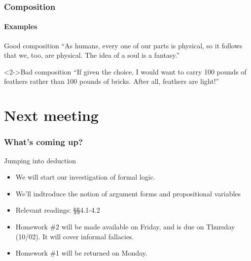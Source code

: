 \documentclass[10pt,letterpaper,xcolor=dvipsnames,handout]{beamer}
\begin{document}
\begin{frame}
  \frametitle{Composition}
  \framesubtitle{Examples}
  
  \begin{block}{Good composition}
    ``As humans, every one of our parts is physical, so it follows that we, too, are physical.  The idea of a soul is a fantasy.''
  \end{block}
  
  \begin{block}<2->{Bad composition}
    ``If given the choice, I would want to carry 100 pounds of feathers rather than 100 pounds of bricks.  After all, feathers are light!''
  \end{block}
  
\end{frame}



\section{Next meeting}

\begin{frame}
  \frametitle{What's coming up?}

  \begin{block}{Jumping into deduction}
    \begin{itemize}
      \item We will start our investigation of formal logic.
      \item We'll indtroduce the notion of argument forms and propositional variables
      \item Relevant readings: \S\S 4.1-4.2
      \item Homework \#2 will be made available on Friday, and is due on Thursday (10/02).  It will cover informal fallacies.
      \item Homework \#1 will be returned on Monday.
    \end{itemize}
  \end{block}
  
\end{frame}
\end{document}
